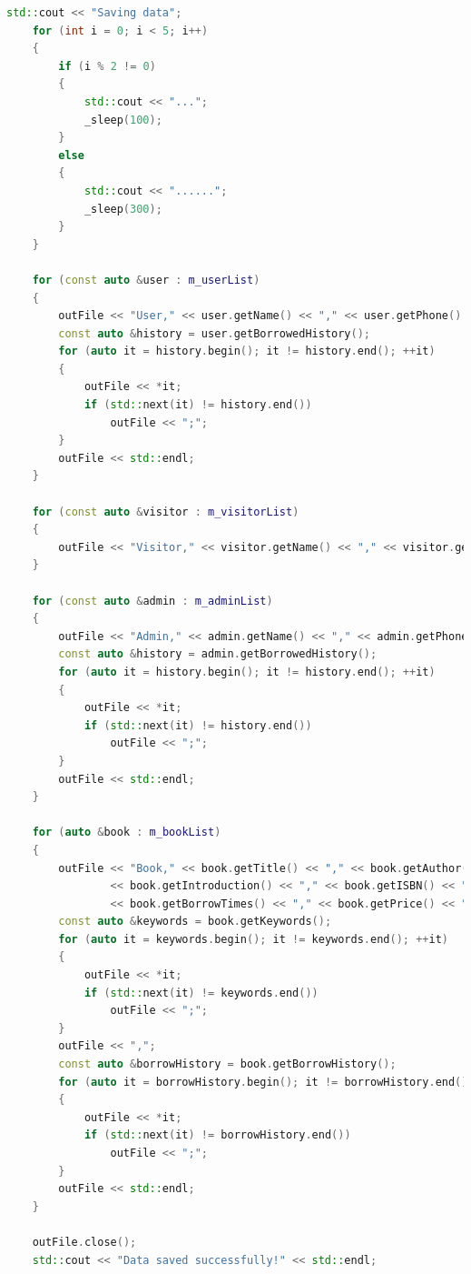 \documentclass[12pt,twoside]{ctexart}
\begin{document}
\begin{lstlisting}[language=C++]
    std::cout << "Saving data";
    for (int i = 0; i < 5; i++)
    {
        if (i % 2 != 0)
        {
            std::cout << "...";
            _sleep(100);
        }
        else
        {
            std::cout << "......";
            _sleep(300);
        }
    }

    for (const auto &user : m_userList)
    {
        outFile << "User," << user.getName() << "," << user.getPhone() << "," << user.getborrowingNum() << ",";
        const auto &history = user.getBorrowedHistory();
        for (auto it = history.begin(); it != history.end(); ++it)
        {
            outFile << *it;
            if (std::next(it) != history.end())
                outFile << ";";
        }
        outFile << std::endl;
    }

    for (const auto &visitor : m_visitorList)
    {
        outFile << "Visitor," << visitor.getName() << "," << visitor.getPhone() << "," << visitor.getVisitNum() << std::endl;
    }

    for (const auto &admin : m_adminList)
    {
        outFile << "Admin," << admin.getName() << "," << admin.getPhone() << "," << admin.getVisitNum() << "," << admin.getborrowingNum() << "," << admin.getAuthority() << ",";
        const auto &history = admin.getBorrowedHistory();
        for (auto it = history.begin(); it != history.end(); ++it)
        {
            outFile << *it;
            if (std::next(it) != history.end())
                outFile << ";";
        }
        outFile << std::endl;
    }

    for (auto &book : m_bookList)
    {
        outFile << "Book," << book.getTitle() << "," << book.getAuthor() << "," << book.getType() << ","
                << book.getIntroduction() << "," << book.getISBN() << "," << book.getBorrowed() << ","
                << book.getBorrowTimes() << "," << book.getPrice() << ",";
        const auto &keywords = book.getKeywords();
        for (auto it = keywords.begin(); it != keywords.end(); ++it)
        {
            outFile << *it;
            if (std::next(it) != keywords.end())
                outFile << ";";
        }
        outFile << ",";
        const auto &borrowHistory = book.getBorrowHistory();
        for (auto it = borrowHistory.begin(); it != borrowHistory.end(); ++it)
        {
            outFile << *it;
            if (std::next(it) != borrowHistory.end())
                outFile << ";";
        }
        outFile << std::endl;
    }

    outFile.close();
    std::cout << "Data saved successfully!" << std::endl;


\end{lstlisting}
\end{document}

